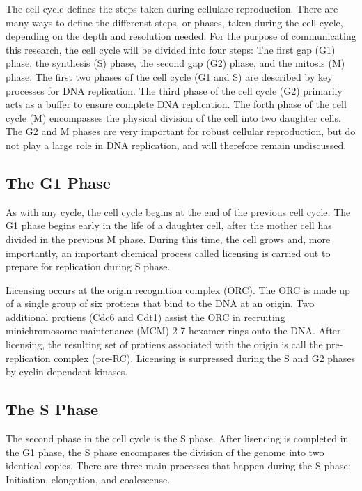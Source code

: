 \documentclass[serif]{sfuthesis}
\begin{document}
	The cell cycle defines the steps taken during cellulare reproduction.
	There are many ways to define the differenst steps, or phases, taken during the cell cycle, depending on the depth and resolution needed.
	For the purpose of communicating this research, the cell cycle will be divided into four steps: The first gap (G1) phase, the synthesis (S) phase, the second gap (G2) phase, and the mitosis (M) phase.
	The first two phases of the cell cycle (G1 and S) are described by key processes for DNA replication.
	The third phase of the cell cycle (G2) primarily acts as a buffer to ensure complete DNA replication.
	The forth phase of the cell cycle (M) encompasses the physical division of the cell into two daughter cells.
	The G2 and M phases are very important for robust cellular reproduction, but do not play a large role in DNA replication, and will therefore remain undiscussed.
	
		\subsection{The G1 Phase}
		
		As with any cycle, the cell cycle begins at the end of the previous cell cycle.
		The G1 phase begins early in the life of a daughter cell, after the mother cell has divided in the previous M phase.
		During this time, the cell grows and, more importantly, an important chemical process called licensing is carried out to prepare for replication during S phase.
		
		Licensing occurs at the origin recognition complex (ORC).
		The ORC is made up of a single group of six protiens that bind to the DNA at an origin.
		Two additional protiens (Cdc6 and Cdt1) assist the ORC in recruiting minichromosome maintenance (MCM) 2-7 hexamer rings onto the DNA.
		After licensing, the resulting set of protiens associated with the origin is call the pre-replication complex (pre-RC).
		Licensing is surpressed during the S and G2 phases by cyclin-dependant kinases.\cite{MolecularCellBiology}
		
		\subsection{The S Phase}
		
		The second phase in the cell cycle is the S phase.
		After lisencing is completed in the G1 phase, the S phase encompases the division of the genome into two identical copies.
		There are three main processes that happen during the S phase: Initiation, elongation, and coalescense.
		
\end{document}
